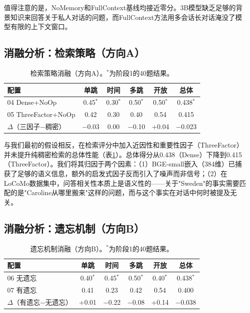 \documentclass[11pt,a4paper]{ctexart}
\begin{document}
值得注意的是，NoMemory和FullContext基线均接近零分。3B模型缺乏足够的背景知识来回答关于私人对话的问题，而FullContext方法用多会话长对话淹没了模型有限的上下文窗口。

\subsection{消融分析：检索策略（方向A）}

\begin{table}[H]
\centering
\begin{tabular}{@{}lccccc@{}}
\toprule
\textbf{配置} & \textbf{单跳} & \textbf{时间} & \textbf{多跳} & \textbf{开放} & \textbf{总体} \\
\midrule
04 Dense+NoOp & 0.45$^*$ & 0.30$^*$ & 0.50$^*$ & 0.50$^*$ & 0.438$^*$ \\
05 ThreeFactor+NoOp & 0.42 & 0.30 & 0.40 & 0.54 & 0.415 \\
\midrule
$\Delta$（三因子$-$稠密） & $-$0.03 & 0.00 & $-$0.10 & +0.04 & $-$0.023 \\
\bottomrule
\end{tabular}
\caption{检索策略消融（方向A）。$^*$为阶段1的40题结果。}
\label{tab:abl_a}
\end{table}

与我们最初的假设相反，在检索评分中加入近因性和重要性因子（ThreeFactor）并未提升纯稠密检索的总体性能（表\ref{tab:abl_a}）。总体得分从0.438（Dense）下降到0.415（ThreeFactor）。我们将其归因于两个因素：（1）BGE-small嵌入（384维）已捕获了足够的语义信息，额外的启发式因子反而引入了噪声而非信号；（2）在LoCoMo数据集中，问答相关性本质上是语义性的——关于"Sweden"的事实需要匹配的是"Caroline从哪里搬来"这样的问题，而与这个事实在对话中何时被提及无关。

\subsection{消融分析：遗忘机制（方向B）}

\begin{table}[H]
\centering
\begin{tabular}{@{}lccccc@{}}
\toprule
\textbf{配置} & \textbf{单跳} & \textbf{时间} & \textbf{多跳} & \textbf{开放} & \textbf{总体} \\
\midrule
06 无遗忘 & 0.40$^*$ & 0.45$^*$ & 0.50$^*$ & 0.40$^*$ & 0.438$^*$ \\
07 有遗忘 & 0.41 & 0.23 & 0.42 & 0.54 & 0.400 \\
\midrule
$\Delta$（有遗忘$-$无遗忘） & +0.01 & $-$0.22 & $-$0.08 & +0.14 & $-$0.038 \\
\bottomrule
\end{tabular}
\caption{遗忘机制消融（方向B）。$^*$为阶段1的40题结果。}
\label{tab:abl_b}
\end{table}
\end{document}
